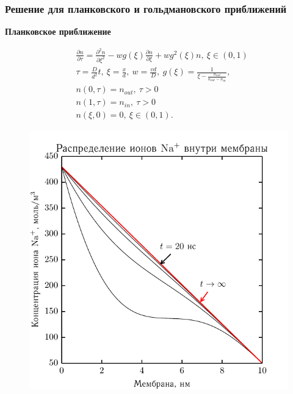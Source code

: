 \documentclass[10pt,pdf]{beamer}
\newcommand{\pder}[2] {\frac{\partial #1}{\partial #2}}
\newcommand{\ppder}[2]{\frac{\partial^2 #1}{\partial {#2}^2}}
\begin{document}
  \begin{frame}
      \frametitle{Решение для планковского и гольдмановского приближений}
      \textbf{Планковское приближение}

      \begin{minipage}{.3\textwidth}
          \begingroup
\everymath{\scriptstyle}
\scriptsize
        \begin{align*}
        & \pder{n}{\tau} = \ppder{n}{\xi} - wg(\xi)\pder{n}{\xi} + wg^2(\xi)n,
            \ \xi\in(0,1) \\
        & \tau = \frac{D}{d^2}t,\ \xi = \frac{x}{d},\ w = \frac{vd}{D},
        \ g(\xi) = \frac{1}{\xi - \frac{n_{out}}{n_{out} - n_{in}}},\\
        & n(0, \tau) = n_{out},\ \tau>0 \\
        & n(1, \tau) = n_{in},\ \tau>0 \\
        & n(\xi, 0) = 0,\ \xi\in(0,1).
    \end{align*}
\endgroup
\end{minipage}\hfill
      \begin{minipage}{.3\textwidth}
    \begin{figure}[H]
    \begin{center}
        \includegraphics[width=\textwidth]{../plots/linear_conc}
    \end{center}
    \end{figure}
\end{minipage}



\end{frame}
\end{document}
